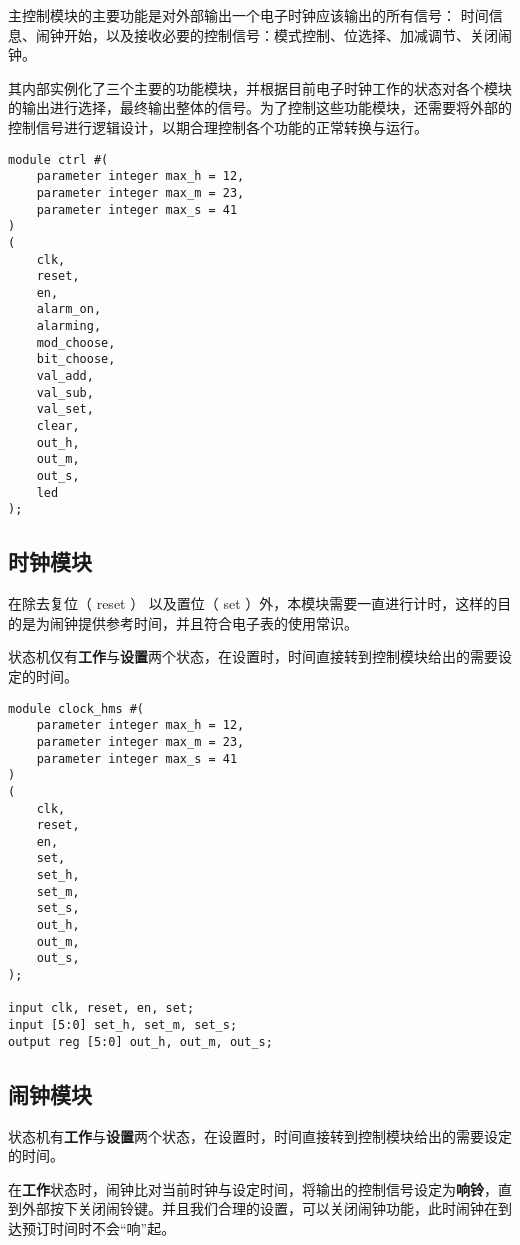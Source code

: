 \documentclass[lang=cn,11pt,a4paper,cite=authoryear]{elegantpaper}
\begin{document}
主控制模块的主要功能是对外部输出一个电子时钟应该输出的所有信号： 时间信息、闹钟开始，以及接收必要的控制信号：模式控制、位选择、加减调节、关闭闹钟。

其内部实例化了三个主要的功能模块，并根据目前电子时钟工作的状态对各个模块的输出进行选择，最终输出整体的信号。为了控制这些功能模块，还需要将外部的控制信号进行逻辑设计，以期合理控制各个功能的正常转换与运行。

\begin{lstlisting}[caption={主控制模块端口定义}]
module ctrl #(
    parameter integer max_h = 12,
    parameter integer max_m = 23,
    parameter integer max_s = 41
) 
(
    clk,
    reset,
    en,
    alarm_on,
    alarming,
    mod_choose,
    bit_choose,
    val_add,
    val_sub,
    val_set,
    clear,
    out_h,
    out_m,
    out_s,
    led
);
\end{lstlisting}

\subsection{时钟模块}

在除去复位（ reset ） 以及置位（ set ）外，本模块需要一直进行计时，这样的目的是为闹钟提供参考时间，并且符合电子表的使用常识。

状态机仅有\textbf{工作}与\textbf{设置}两个状态，在设置时，时间直接转到控制模块给出的需要设定的时间。

\begin{lstlisting}[caption={时钟模块端口定义}]
module clock_hms #(
    parameter integer max_h = 12,
    parameter integer max_m = 23,
    parameter integer max_s = 41
) 
(
    clk,
    reset,
    en,
    set,
    set_h,
    set_m,
    set_s,
    out_h,
    out_m,
    out_s,
);

input clk, reset, en, set;
input [5:0] set_h, set_m, set_s;
output reg [5:0] out_h, out_m, out_s;
\end{lstlisting}
    
    
\subsection{闹钟模块}

状态机有\textbf{工作}与\textbf{设置}两个状态，在设置时，时间直接转到控制模块给出的需要设定的时间。

在\textbf{工作}状态时，闹钟比对当前时钟与设定时间，将输出的控制信号设定为\textbf{响铃}，直到外部按下关闭闹铃键。并且我们合理的设置，可以关闭闹钟功能，此时闹钟在到达预订时间时不会“响”起。
\end{document}
